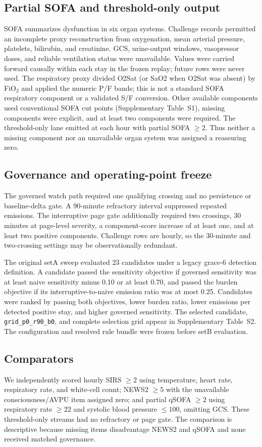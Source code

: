 \documentclass[11pt]{article}
\begin{document}
\subsection{Partial SOFA and threshold-only output}
SOFA summarizes dysfunction in six organ systems.\citep{vincent1996sofa}
Challenge records permitted an incomplete proxy reconstruction from oxygenation,
mean arterial pressure, platelets, bilirubin, and creatinine. GCS, urine-output
windows, vasopressor doses, and reliable ventilation status were unavailable.
Values were carried forward causally within each stay in the frozen replay;
future rows were never used. The respiratory proxy divided O2Sat (or SaO2 when
O2Sat was absent) by FiO$_2$ and applied the numeric P/F bands; this is not a
standard SOFA respiratory component or a validated S/F conversion. Other
available components used conventional SOFA cut points (Supplementary
Table~S1), missing components were explicit, and
at least two components were required. The threshold-only lane emitted at each
hour with partial SOFA $\geq2$. Thus neither a missing component nor an
unavailable organ system was assigned a reassuring zero.

\subsection{Governance and operating-point freeze}
The governed watch path required one qualifying crossing and no persistence or
baseline-delta gate. A 90-minute refractory interval suppressed repeated
emissions. The interruptive page gate additionally required two crossings,
30 minutes at page-level severity, a component-score increase of at least one,
and at least two positive components. Challenge rows are hourly, so the 30-minute
and two-crossing settings may be observationally redundant.

The original setA sweep evaluated 23 candidates under a legacy grace-6
detection definition. A candidate passed the sensitivity objective if governed
sensitivity was at least naive sensitivity minus 0.10 or at least 0.70, and
passed the burden objective if its interruptive-to-naive emission ratio was at
most 0.25. Candidates were ranked by passing both objectives, lower burden
ratio, lower emissions per detected positive stay, and higher governed
sensitivity. The selected candidate, \texttt{grid\_p0\_r90\_b0}, and complete
selection grid appear in Supplementary Table~S2. The configuration and resolved
rule bundle were frozen before setB evaluation.

\subsection{Comparators}
We independently scored hourly SIRS $\geq2$ using temperature, heart rate,
respiratory rate, and white-cell count;\citep{bone1992} NEWS2 $\geq5$ with the
unavailable consciousness/AVPU item assigned zero;\citep{rcp2017news2} and
partial qSOFA $\geq2$ using respiratory rate $\geq22$ and systolic blood pressure
$\leq100$, omitting GCS.\citep{seymour2016sepsis3} These threshold-only streams
had no refractory or page gate. The comparison is descriptive because missing
items disadvantage NEWS2 and qSOFA and none received matched governance.
\end{document}
